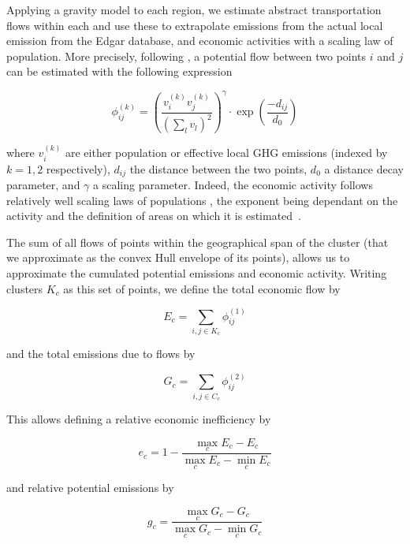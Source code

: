 \documentclass{jimis-en}
\begin{document}
Applying a gravity model to each region, we estimate abstract transportation flows within each and use these to extrapolate emissions from the actual local emission from the Edgar database, and economic activities with a scaling law of population.  More precisely, following \cite{raimbault2018indirect}, a potential flow between two points $i$ and $j$ can be estimated with the following expression 

\begin{equation}
\phi_{ij}^{(k)} = \left(\frac{v^{(k)}_i v^{(k)}_j}{(\sum_l v_l)^2}\right)^\gamma \cdot \exp\left(\frac{-d_{ij}}{d_0}\right)
\end{equation}

where $v^{(k)}_i$ are either population or effective local GHG emissions (indexed by $k = 1,2$ respectively), $d_{ij}$ the distance between the two points, $d_0$ a distance decay parameter, and $\gamma$ a scaling parameter. Indeed, the economic activity follows relatively well scaling laws of populations \citep{bettencourt2007growth}, the exponent being dependant on the activity and the definition of areas on which it is estimated~\citep{cottineau2017diverse}.

The sum of all flows of points within the geographical span of the cluster (that we approximate as the convex Hull envelope of its points), allows us to approximate the cumulated potential emissions and economic activity. Writing clusters $K_c$ as this set of points, we define the total economic flow by 

\begin{equation}
E_c = \sum_{i,j \in K_c} \phi_{ij}^{(1)}
\end{equation}

and the total emissions due to flows by

\begin{equation}
G_c = \sum_{i,j \in C_c} \phi_{ij}^{(2)}
\end{equation}

This allows defining a relative economic inefficiency by 

\begin{equation}
e_c = 1 - \frac{\max_c E_c - E_c}{\max_c E_c - \min_c E_c}
\end{equation}

and relative potential emissions by

\begin{equation}
g_c = \frac{\max_c G_c - G_c}{\max_c G_c - \min_c G_c}
\end{equation}
\end{document}
